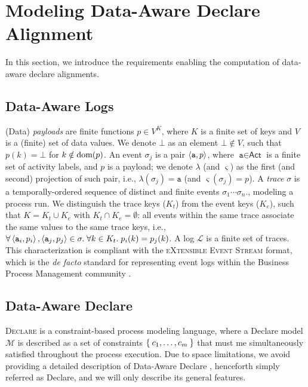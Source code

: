 \section{Modeling Data-Aware Declare Alignment}
In this section, we introduce the requirements enabling the computation of data-aware declare alignments.

\subsection{Data-Aware Logs}
(Data) \textit{payloads} are finite functions $p\in V^K$, where $K$ is a finite set of keys and $V$ is a (finite) set of data values. We denote $\bot$ as an element $\bot\notin V$, such that $p(k)=\bot$ for $k\notin\textup{dom}(p)$. An event $\sigma_j$ is a pair $\Braket{\texttt{a},p}$, where $\texttt{a}\in\textsf{Act}$ is a finite set of activity labels, and $p$ is a payload; we denote $\lambda$ (and $\varsigma$) as the first (and second) projection of such pair, i.e., $\lambda(\sigma_j)=\texttt{a}$ (and $\varsigma(\sigma_j)=p$). A \textit{trace} $\sigma$ is a temporally-ordered sequence of distinct and finite events $\sigma_1\cdots\sigma_n$., modeling a process run. We distinguish the trace keys ($K_t$) from the event keys ($K_e$), such that $K=K_t\cup K_e$ with $K_t\cap K_e=\emptyset$: all events within the same trace associate the same values to the same trace keys, i.e., $\forall \Braket{\texttt{a}_i,p_i},\Braket{\texttt{a}_j,p_j}\in\sigma.\;\forall k\in K_t.\; p_i(k)=p_j(k)$. A log $\mathcal{L}$ is a finite set of traces. This  characterization is compliant with the \textsc{eXtensible Event Stream} format, which is the \textit{de facto} standard for representing event logs within the Business Process Management community \cite{SchonigCMM16,LenoDM18}.


\subsection{Data-Aware Declare}\label{ssec:dad}
\textsc{Declare} is a constraint-based process modeling language, where a Declare model $\mathcal{M}$ is described as a set of constraints $\Set{c_1,\dots,c_m}$ that must me simultaneously satisfied throughout the process execution. Due to space limitations, we avoid providing a detailed description of Data-Aware Declare \cite{SchonigCMM16,LenoDM18}, henceforth simply referred as Declare, and we will only describe its general features.

